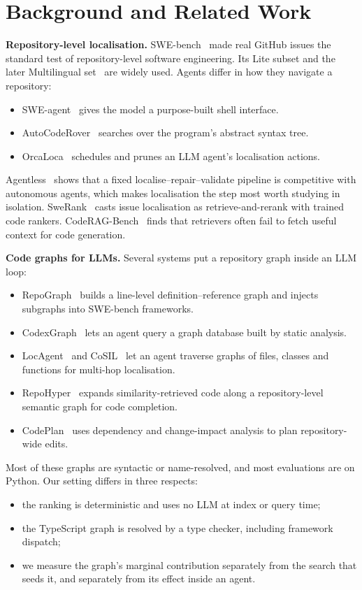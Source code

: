 \documentclass[sigconf,nonacm]{acmart}
\begin{document}
\section{Background and Related Work}

\noindent\textbf{Repository-level localisation.} SWE-bench~\cite{jimenez2024swebench} made real GitHub issues the standard test of repository-level software engineering. Its Lite subset and the later Multilingual set~\cite{yang2025swesmith} are widely used. Agents differ in how they navigate a repository:
\begin{itemize}
\item SWE-agent~\cite{yang2024sweagent} gives the model a purpose-built shell interface.
\item AutoCodeRover~\cite{zhang2024autocoderover} searches over the program's abstract syntax tree.
\item OrcaLoca~\cite{yu2025orcaloca} schedules and prunes an LLM agent's localisation actions.
\end{itemize}
Agentless~\cite{xia2024agentless} shows that a fixed localise--repair--validate pipeline is competitive with autonomous agents, which makes localisation the step most worth studying in isolation. SweRank~\cite{reddy2025swerank} casts issue localisation as retrieve-and-rerank with trained code rankers. CodeRAG-Bench~\cite{wang2025coderagbench} finds that retrievers often fail to fetch useful context for code generation.

\smallskip\noindent\textbf{Code graphs for LLMs.} Several systems put a repository graph inside an LLM loop:
\begin{itemize}
\item RepoGraph~\cite{ouyang2025repograph} builds a line-level definition--reference graph and injects subgraphs into SWE-bench frameworks.
\item CodexGraph~\cite{liu2025codexgraph} lets an agent query a graph database built by static analysis.
\item LocAgent~\cite{chen2025locagent} and CoSIL~\cite{jiang2025cosil} let an agent traverse graphs of files, classes and functions for multi-hop localisation.
\item RepoHyper~\cite{phan2024repohyper} expands similarity-retrieved code along a repository-level semantic graph for code completion.
\item CodePlan~\cite{bairi2024codeplan} uses dependency and change-impact analysis to plan repository-wide edits.
\end{itemize}
Most of these graphs are syntactic or name-resolved, and most evaluations are on Python. Our setting differs in three respects:
\begin{itemize}
\item the ranking is deterministic and uses no LLM at index or query time;
\item the TypeScript graph is resolved by a type checker, including framework dispatch;
\item we measure the graph's marginal contribution separately from the search that seeds it, and separately from its effect inside an agent.
\end{itemize}
\end{document}

